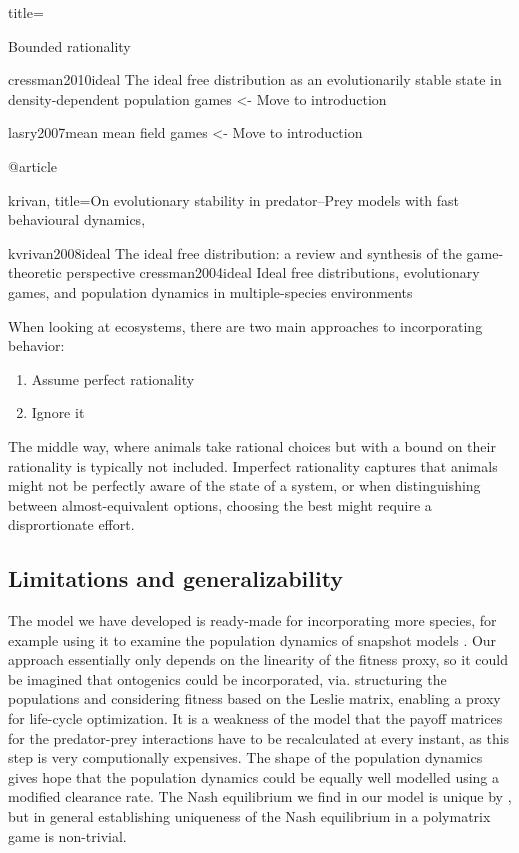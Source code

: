   title={Bounded rationality

cressman2010ideal The ideal free distribution as an evolutionarily stable state in density-dependent population games <- Move to introduction

lasry2007mean mean field games <- Move to introduction

@article{krivan,
  title={On evolutionary stability in predator--Prey models with fast behavioural dynamics},

kvrivan2008ideal The ideal free distribution: a review and synthesis of the game-theoretic perspective
cressman2004ideal Ideal free distributions, evolutionary games, and population dynamics in multiple-species environments

When looking at ecosystems, there are two main approaches to incorporating behavior:
\begin{enumerate}
  \item Assume perfect rationality
  \item Ignore it
\end{enumerate}
The middle way, where animals take rational choices but with a bound on their rationality is typically not included. Imperfect rationality captures that animals might not be perfectly aware of the state of a system, or when distinguishing between almost-equivalent options, choosing the best might require a disprortionate effort.

\subsection{Limitations and generalizability} %
The model we have developed is ready-made for incorporating more species, for example using it to examine the population dynamics of snapshot models \citep{pinti2019trophic}. Our approach essentially only depends on the linearity of the fitness proxy, so it could be imagined that ontogenics could be incorporated, via. structuring the populations and considering fitness based on the Leslie matrix, enabling a proxy for life-cycle optimization. It is a weakness of the model that the payoff matrices for the predator-prey interactions have to be recalculated at every instant, as this step is very computionally expensives. The shape of the population dynamics gives hope that the population dynamics could be equally well modelled using a modified clearance rate. The Nash equilibrium we find in our model is unique by \citep{verticalmigration}, but in general establishing uniqueness of the Nash equilibrium in a polymatrix game is non-trivial.

}}
